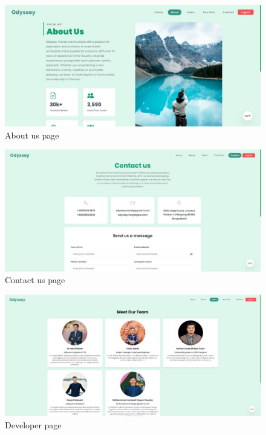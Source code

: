 \documentclass{scrreprt}
\begin{document}
\begin{figure}[h!]
    \centering
    \includegraphics[width=1.1\textwidth, height=0.35\textheight]{./SS/about.jpg}
    \caption{About us page}
    \label{fig:about}
\end{figure}

\begin{figure}[h!]
    \centering
    \includegraphics[width=1.1\textwidth, height=0.35\textheight]{./SS/contact_us.jpg}
    \caption{Contact us page}
    \label{fig:contact_us}
\end{figure}

\begin{figure}[h!]
    \centering
    \includegraphics[width=1.1\textwidth, height=0.35\textheight]{./SS/developer.jpg}
    \caption{Developer page}
    \label{fig:developer}
\end{figure}
\end{document}
